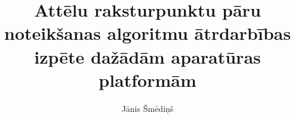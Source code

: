 \documentclass[magjistrs]{vea-diplomdarbs}
\title{Attēlu raksturpunktu pāru noteikšanas algoritmu ātrdarbības izpēte dažādām aparatūras platformām}
\author{Jānis Šmēdiņš}
\numberwithin{equation}{section}
\begin{document}
	\pagestyle{empty}
	
	\onehalfspacing %
	\tableofcontents\clearpage
	\sloppy %
	
	\renewcommand{\thelstlisting}{\thesection.\arabic{lstlisting}}
	
	
	
	
	\clearpage
	\pagestyle{plain} %
	
	
	
	\clearpage %
	\clearpage
	\clearpage
	\clearpage
	\clearpage
	
	\clearpage
	
	\clearpage
	
	\clearpage
	
	\clearpage
\end{document}
